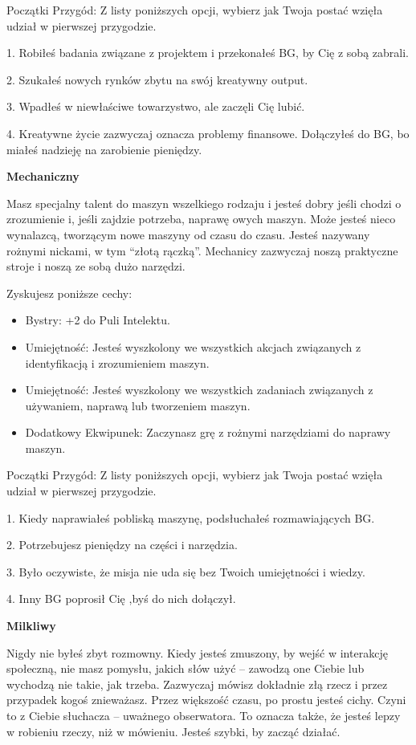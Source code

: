 Początki Przygód: Z listy poniższych opcji, wybierz jak Twoja postać wzięła udział w pierwszej przygodzie.

1. Robiłeś badania związane z projektem i przekonałeś BG, by Cię z sobą zabrali.

2. Szukałeś nowych rynków zbytu na swój kreatywny output.

3. Wpadłeś w niewłaściwe towarzystwo, ale zaczęli Cię lubić.

4. Kreatywne życie zazwyczaj oznacza problemy finansowe. Dołączyłeś do BG, bo miałeś nadzieję na zarobienie pieniędzy.

\textbf{Mechaniczny}

Masz specjalny talent do maszyn wszelkiego rodzaju i jesteś dobry jeśli chodzi o zrozumienie i, jeśli zajdzie potrzeba, naprawę owych maszyn. Może jesteś nieco wynalazcą, tworzącym nowe maszyny od czasu do czasu. Jesteś nazywany rożnymi nickami, w tym “złotą rączką”. Mechanicy zazwyczaj noszą praktyczne stroje i noszą ze sobą dużo narzędzi.

Zyskujesz poniższe cechy:
\begin{itemize}
\item Bystry: +2 do Puli Intelektu.
\item Umiejętność: Jesteś wyszkolony we wszystkich akcjach związanych z identyfikacją i zrozumieniem maszyn.
\item Umiejętność: Jesteś wyszkolony we wszystkich zadaniach związanych z używaniem, naprawą lub tworzeniem maszyn.
\item  Dodatkowy Ekwipunek: Zaczynasz grę z rożnymi narzędziami do naprawy maszyn.
\end{itemize}    
    
Początki Przygód: Z listy poniższych opcji, wybierz jak Twoja postać wzięła udział w pierwszej przygodzie.

1. Kiedy naprawiałeś pobliską maszynę, podsłuchałeś rozmawiających BG.

2. Potrzebujesz pieniędzy na części i narzędzia.

3. Było oczywiste, że misja nie uda się bez Twoich umiejętności i wiedzy.

4. Inny BG poprosił Cię ,byś do nich dołączył.

\textbf{Milkliwy} 

Nigdy nie byłeś zbyt rozmowny. Kiedy jesteś zmuszony, by wejść w interakcję społeczną, nie masz pomysłu, jakich słów użyć – zawodzą one Ciebie lub wychodzą nie takie, jak trzeba. Zazwyczaj mówisz dokładnie złą rzecz i przez przypadek kogoś znieważasz. Przez większość czasu, po prostu jesteś cichy. Czyni to z Ciebie słuchacza – uważnego obserwatora. To oznacza także, że jesteś lepzy w robieniu rzeczy, niż w mówieniu. Jesteś szybki, by zacząć działać.

